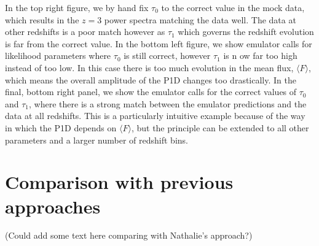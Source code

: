 \documentclass[]{article}
\begin{document}
\noindent In the top right figure, we by hand fix $\tau_0$ to the correct value in the mock data, which results in the $z=3$ power spectra matching the data well.
The data at other redshifts is a poor match
however as $\tau_1$ which governs the redshift evolution is far from the correct value.
In the bottom left figure, we show emulator calls for likelihood parameters
where $\tau_0$ is still correct, however $\tau_1$ is n  ow far too high instead of too low.
In this case there is too much evolution in the mean flux, $\langle F\rangle$, which
means the overall amplitude of the P1D changes too drastically. In the final, bottom right
panel, we show the emulator calls for the correct values of $\tau_0$ and $\tau_1$, where
there is a strong match between the emulator predictions and the data at all redshifts.
This is a particularly intuitive example because of the way in which the P1D depends
on $\langle F\rangle$, but the principle can be extended to all other parameters and
a larger number of redshift bins.

\section{Comparison with previous approaches}
(Could add some text here comparing with Nathalie's approach?)


\clearpage
\appendix
\end{document}

